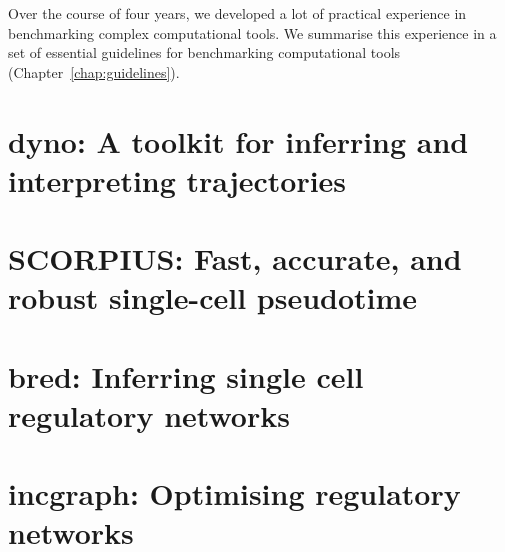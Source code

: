 Over the course of four years, we developed a lot of practical experience in benchmarking complex computational tools. We summarise this experience in a set of essential guidelines for benchmarking computational tools (Chapter~\ref{chap:guidelines}).


\section{dyno: A toolkit for inferring and interpreting trajectories}

\section{SCORPIUS: Fast, accurate, and robust single-cell pseudotime}




\section{bred: Inferring single cell regulatory networks}


\section{incgraph: Optimising regulatory networks}


